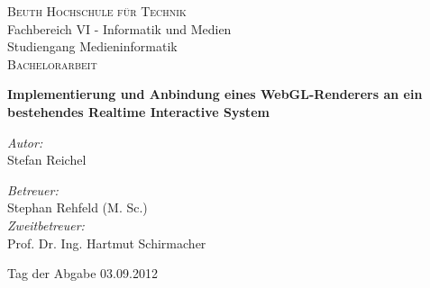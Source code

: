 \begin{titlepage}

\begin{center}
\textsc{\LARGE Beuth Hochschule für Technik}\\
\large{Fachbereich VI - Informatik und Medien\\Studiengang Medieninformatik}\\[50mm]
\textsc{\large Bachelorarbeit}\\
\end{center}
\LARGE{\bfseries{Implementierung und Anbindung eines WebGL-Renderers an ein bestehendes Realtime Interactive System}}
\vspace{10mm}

\begin{center}
\begin{minipage}[t]{0.4\textwidth}
\begin{flushleft} \large
\emph{Autor:}\\
Stefan Reichel
\end{flushleft}
\end{minipage}
\begin{minipage}[t]{0.5\textwidth}
\begin{flushright} \large
\emph{Betreuer:} \\
Stephan Rehfeld (M. Sc.)\\
\medskip
\emph{Zweitbetreuer:} \\
Prof. Dr. Ing. Hartmut Schirmacher
\end{flushright}
\end{minipage}

\vfill

{\large Tag der Abgabe 03.09.2012}
\end{center}

\end{titlepage}